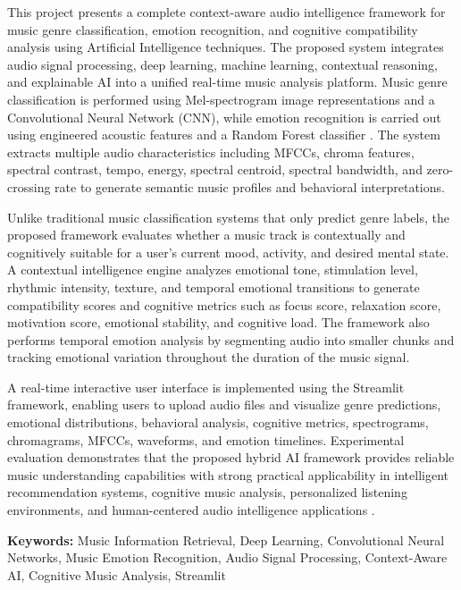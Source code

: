 \documentclass[12pt,a4paper]{report}
\begin{document}
This project presents a complete context-aware audio intelligence framework for music genre classification, emotion recognition, and cognitive compatibility analysis using Artificial Intelligence techniques. The proposed system integrates audio signal processing, deep learning, machine learning, contextual reasoning, and explainable AI into a unified real-time music analysis platform. Music genre classification is performed using Mel-spectrogram image representations and a Convolutional Neural Network (CNN), while emotion recognition is carried out using engineered acoustic features and a Random Forest classifier \cite{r3,r5,r9}. The system extracts multiple audio characteristics including MFCCs, chroma features, spectral contrast, tempo, energy, spectral centroid, spectral bandwidth, and zero-crossing rate to generate semantic music profiles and behavioral interpretations.

Unlike traditional music classification systems that only predict genre labels, the proposed framework evaluates whether a music track is contextually and cognitively suitable for a user’s current mood, activity, and desired mental state. A contextual intelligence engine analyzes emotional tone, stimulation level, rhythmic intensity, texture, and temporal emotional transitions to generate compatibility scores and cognitive metrics such as focus score, relaxation score, motivation score, emotional stability, and cognitive load. The framework also performs temporal emotion analysis by segmenting audio into smaller chunks and tracking emotional variation throughout the duration of the music signal.

A real-time interactive user interface is implemented using the Streamlit framework, enabling users to upload audio files and visualize genre predictions, emotional distributions, behavioral analysis, cognitive metrics, spectrograms, chromagrams, MFCCs, waveforms, and emotion timelines. Experimental evaluation demonstrates that the proposed hybrid AI framework provides reliable music understanding capabilities with strong practical applicability in intelligent recommendation systems, cognitive music analysis, personalized listening environments, and human-centered audio intelligence applications \cite{r4,r9,r14}.

\textbf{Keywords:} Music Information Retrieval, Deep Learning, Convolutional Neural Networks, Music Emotion Recognition, Audio Signal Processing, Context-Aware AI, Cognitive Music Analysis, Streamlit

\newpage
\end{document}
